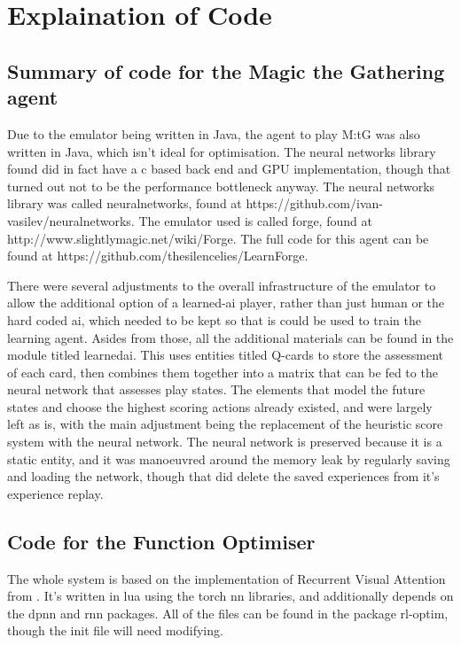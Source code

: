 \appendix

\section{Explaination of Code}

\subsection{Summary of code for the Magic the Gathering agent}
Due to the emulator being written in Java, the agent to play M:tG was also written in Java, which isn't ideal for optimisation. The neural networks library found did in fact have a c based back end and GPU implementation, though that turned out not to be the performance bottleneck anyway. The neural networks library was called neuralnetworks, found at https://github.com/ivan-vasilev/neuralnetworks. The emulator used is called forge, found at http://www.slightlymagic.net/wiki/Forge. The full code for this agent can be found at https://github.com/thesilencelies/LearnForge. 

There were several adjustments to the overall infrastructure of the emulator to allow the additional option of a learned-ai player, rather than just human or the hard coded ai, which needed to be kept so that is could be used to train the learning agent. Asides from those, all the additional materials can be found in the module titled learnedai. This uses entities titled Q-cards to store the assessment of each card, then combines them together into a matrix that can be fed to the neural network that assesses play states. The elements that model the future states and choose the highest scoring actions already existed, and were largely left as is, with the main adjustment being the replacement of the heuristic score system with the neural network.
The neural network is preserved because it is a static entity, and it was manoeuvred around the memory leak by regularly saving and loading the network, though that did delete the saved experiences from it's experience replay.

\subsection{Code for the Function Optimiser}
The whole system is based on the implementation of Recurrent Visual Attention from \cite{Torch:RVA}. It's written in lua using the torch nn libraries, and additionally depends on the dpnn and rnn packages. All of the files can be found in the package rl-optim, though the init file will need modifying.

